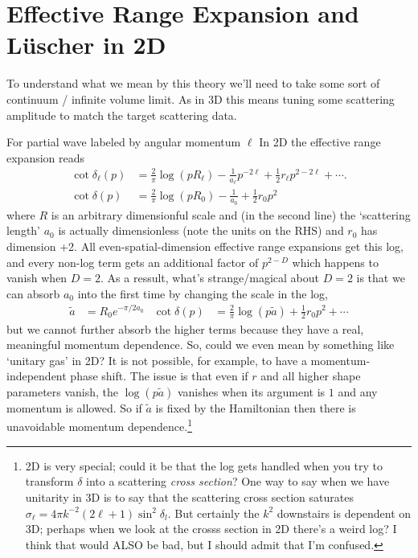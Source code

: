 \section{Effective Range Expansion and L\"{u}scher in 2D}

To understand what we mean by this theory we'll need to take some sort of continuum / infinite volume limit.
As in 3D this means tuning some scattering amplitude to match the target scattering data.

For partial wave labeled by angular momentum $\ell$ In 2D the effective range expansion reads
\begin{align}
	\cot \delta_\ell(p)
	&=
			\frac{2}{\pi} \log(p R_\ell)
		-	\frac{1}{a_\ell} p^{-2\ell}
		+	\frac{1}{2} r_\ell p^{2-2\ell}
		+	\cdots.
	\\
	\cot \delta(p)
	&=
			\frac{2}{\pi} \log(p R_0)
		-	\frac{1}{a_0}
		+	\frac{1}{2} r_0 p^2
\end{align}
where $R$ is an arbitrary dimensionful scale and (in the second line) the `scattering length' $a_0$ is actually dimensionless (note the units on the RHS) and $r_0$ has dimension +2.
All even-spatial-dimension effective range expansions get this log, and every non-log term gets an additional factor of $p^{2-D}$ which happens to vanish when $D=2$.
As a ressult, what's strange/magical about $D=2$ is that we can absorb $a_0$ into the first time by changing the scale in the log,
\begin{align}
	\tilde{a} &= R_0 e^{-\pi/2a_0}
	&
	\cot \delta(p)
	&=
			\frac{2}{\pi} \log(p \tilde{a})
		+	\frac{1}{2} r_0 p^2
		+	\cdots
		\label{eq:ere}
\end{align}
but we cannot further absorb the higher terms because they have a real, meaningful momentum dependence.
So, could we even mean by something like `unitary gas' in 2D?
It is not possible, for example, to have a momentum-independent phase shift.
The issue is that even if $r$ and all higher shape parameters vanish, the $\log(p\tilde{a})$ vanishes when its argument is $1$ and any momentum is allowed.
So if $\tilde{a}$ is fixed by the Hamiltonian then there is unavoidable momentum dependence.\footnote{
	2D is very special; could it be that the log gets handled when you try to transform $\delta$ into a scattering \emph{cross section}?
	One way to say when we have unitarity in 3D is to say that the scattering cross section saturates $\sigma_\ell = 4\pi k^{-2} (2\ell+1) \sin^2 \delta_l$.
	But certainly the $k^2$ downstairs is dependent on 3D; perhaps when we look at the crosss section in 2D there's a weird log?
	I think that would ALSO be bad, but I should admit that I'm confused.
	}

